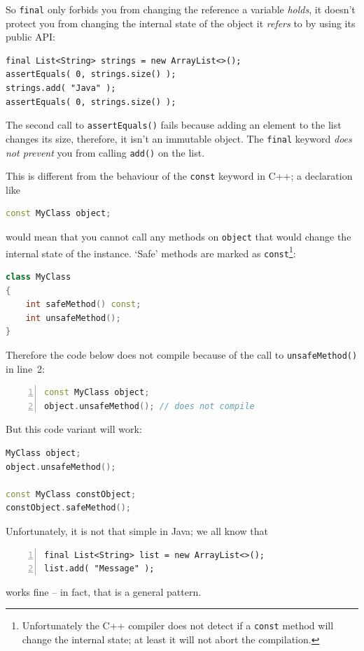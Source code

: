 So \lstinline|final| only forbids you from changing the reference a variable \textit{holds}, it doesn't protect you from changing the internal state of the object it \textit{refers} to by using its public API:
\begin{lstlisting}
final List<String> strings = new ArrayList<>();
assertEquals( 0, strings.size() );
strings.add( "Java" );
assertEquals( 0, strings.size() );
\end{lstlisting}
The second call to \lstinline|assertEquals()| fails because adding an element to the list changes its size, therefore, it isn't an immutable object. The \lstinline|final| keyword \textit{does not prevent} you from calling \lstinline|add()| on the list.

This is different from the behaviour of the \lstinline|const| keyword in C++; a declaration like
\begin{lstlisting}[language=C++]
const MyClass object;
\end{lstlisting}
would mean that you cannot call any methods on \lstinline|object| that would change the internal state of the instance. ‘Safe’ methods are marked as \lstinline|const|\footnote{Unfortunately the C++ compiler does not detect if a \lstinline|const| method will change the internal state; at least it will not abort the compilation.}:
\begin{lstlisting}[language=C++]
class MyClass
{
    int safeMethod() const;
    int unsafeMethod();
}
\end{lstlisting}

Therefore the code below does not compile because of the call to \lstinline|unsafeMethod()| in line~2:
\begin{lstlisting}[numbers=left,language=C++]
const MyClass object;
object.unsafeMethod(); // does not compile
\end{lstlisting}
But this code variant will work:
\begin{lstlisting}[language=C++]
MyClass object;
object.unsafeMethod();

const MyClass constObject;
constObject.safeMethod();
\end{lstlisting}

Unfortunately, it is not that simple in Java; we all know that
\begin{lstlisting}[numbers=left]
final List<String> list = new ArrayList<>();
list.add( "Message" );
\end{lstlisting}
works fine – in fact, that is a general pattern.

